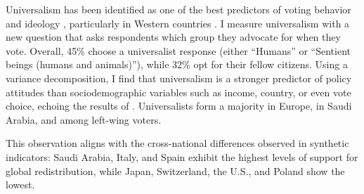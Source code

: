 \documentclass[12pt,english]{article}
\begin{document}
Universalism has been identified as one of the best predictors of voting behavior \citep{enke_moral_2020} and ideology \citep{enke_moral_2023,cappelen_universalism_2025}, particularly in %
Western countries \citep{cappelen_universalism_2025}. 
I measure universalism with a new question that asks respondents which group they advocate for when they vote. Overall, 45\% choose a universalist response (either ``Humans'' or ``Sentient beings (humans and animals)''), while 32\% opt for their fellow citizens. Using a variance decomposition, I find that universalism is a stronger predictor of policy attitudes than sociodemographic variables such as income, country, or even vote choice, echoing the results of \cite{enke_moral_2023}. %
Universalists form a majority in Europe, in Saudi Arabia, and among left-wing voters. 

This observation aligns with the cross-national differences observed in synthetic indicators: Saudi Arabia, Italy, and Spain exhibit the highest levels of support for global redistribution, while Japan, Switzerland, the U.S., and Poland show the lowest. 
\end{document}

